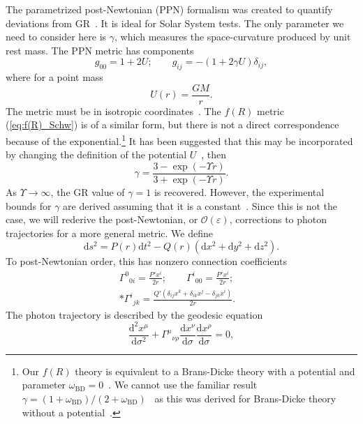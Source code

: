 \documentclass[aps,prd,amsfonts,amssymb,amsmath,nofootinbib,reprint,showpacs]{revtex4-1}
\newcommand{\eqnref}[1]{(\ref{eq:#1})}
\newcommand{\sub}[1]{\ensuremath{_\text{#1}}}
\newcommand{\dd}{\ensuremath{\text{d}}}
\newcommand{\diff}[2]{\ensuremath{\frac{\dd {#1}}{\dd {#2}}}}
\newcommand{\difftwo}[2]{\ensuremath{\frac{\dd^2 {#1}}{\dd {#2}^2}}}
\newcommand{\order}[1]{\ensuremath{\mathcal{O}({#1})}}
\begin{document}
The parametrized post-Newtonian (PPN) formalism was created to quantify deviations from GR~\cite{Will1993, Will2006}. It is ideal for Solar System tests. The only parameter we need to consider here is $\gamma$, which measures the space-curvature produced by unit rest mass. The PPN metric has components
\begin{equation}
g_{00} = 1 + 2U; \qquad g_{ij} = -(1 + 2\gamma U)\delta_{ij},
\end{equation}
where for a point mass
\begin{equation}
U(r) = \frac{GM}{r}.
\end{equation}
The metric must be in isotropic coordinates~\cite{Misner1973,Will1993}. The $f(R)$ metric \eqnref{f(R)_Schw} is of a similar form, but there is not a direct correspondence because of the exponential.\footnote{Our $f(R)$ theory is equivalent to a Brans-Dicke theory with a potential and parameter $\omega\sub{BD} = 0$~\cite{Teyssandier1983, Wands1994}. We cannot use the familiar result $\gamma = (1 + \omega\sub{BD})/(2 + \omega\sub{BD})$~\cite{Will2006} as this was derived for Brans-Dicke theory without a potential~\cite{Will1993}.} It has been suggested that this may be incorporated by changing the definition of the potential $U$~\cite{Olmo2007c, Faulkner2007, Bisabr2010, DeFelice2010}, then
\begin{equation}
\gamma = \frac{3 - \exp(-\Upsilon r)}{3 + \exp(-\Upsilon r)}.
\end{equation}
As $\Upsilon \rightarrow \infty$, the GR value of $\gamma = 1$ is recovered. However, the experimental bounds for $\gamma$ are derived assuming that it is a constant~\cite{Will1993}. Since this is not the case, we will rederive the post-Newtonian, or $\order{\varepsilon}$, corrections to photon trajectories for a more general metric. We define
\begin{equation}
\dd s^2 = P(r)\dd t^2 - Q(r)\left(\dd x^2 + \dd y^2 + \dd z^2\right).
\end{equation}
To post-Newtonian order, this has nonzero connection coefficients
\begin{equation}
\begin{split}
{\Gamma^0}_{0i} = \frac{P'x^i}{2r}; \qquad {\Gamma^i}_{00} = \frac{P'x^i}{2r}; \quad\\*
{\Gamma^i}_{jk} = \frac{Q'(\delta_{ij}x^k + \delta_{ik}x^j-\delta_{jk}x^i)}{2r}.
\end{split}
\end{equation}
The photon trajectory is described by the geodesic equation
\begin{equation}
\difftwo{x^\mu}{\sigma} + {\Gamma^\mu}_{\nu\rho}\diff{x^\nu}{\sigma}\diff{x^\rho}{\sigma} = 0,
\label{eq:Geodesic}
\end{equation}
\end{document}
